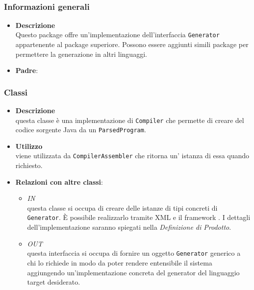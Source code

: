 \subsection{}
\label{\nogloxy{swedesigner::server::generator::java}}
\subsubsection{Informazioni generali}
\begin{itemize}
\item \textbf{Descrizione}\\
Questo package offre un'implementazione dell'interfaccia \texttt{Generator} appartenente al package superiore. Possono essere aggiunti simili package per permettere la generazione in altri linguaggi.
\item \textbf{Padre}: \hyperref[\nogloxy{swedesigner::server::generator}]{}
\end{itemize}
\subsubsection{Classi}
\label{\nogloxy{swedesigner::server::generator::java::JavaGenerator}}
\begin{itemize}
\item \textbf{Descrizione}\\
questa classe è una implementazione di \texttt{Compiler} che permette di creare del codice sorgente Java da un \texttt{ParsedProgram}.
\item \textbf{Utilizzo}\\
viene utilizzata da \texttt{CompilerAssembler} che ritorna un' istanza di essa quando richiesto.
\item \textbf{Relazioni con altre classi}:
\begin{itemize}
\item \textit{IN} \hyperref[\nogloxy{swedesigner::server::generator::GeneratorAssembler}]{}\\
questa classe si occupa di creare delle istanze di tipi concreti di \texttt{Generator}. È possibile realizzarlo tramite XML e il framework \spring. I dettagli dell'implementazione saranno spiegati nella \emph{Definizione di Prodotto}. %
\item \textit{OUT} \hyperref[\nogloxy{swedesigner::server::generator::Generator}]{}\\
questa interfaccia si occupa di fornire un oggetto \texttt{Generator} generico a chi lo richiede in modo da poter rendere entensibile il sistema aggiungendo un'implementazione concreta del generator del linguaggio target desiderato.
\end{itemize}
\end{itemize}
